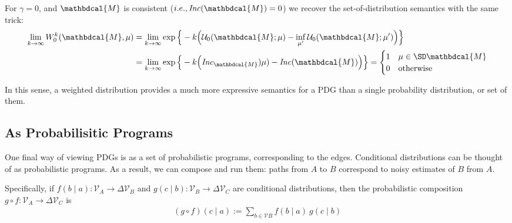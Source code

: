 \documentclass[letterpaper]{article} %
\theoremstyle{plain}
\theoremstyle{definition}
\theoremstyle{remark}
\newcommand{\note}[1]{{\color{blue}\ \!\Large\smash{\textbf{[}}{\normalsize\textsc{note:} #1}\ \!\smash{\textbf{]}}}}
\newcommand{\dg}[1]{\mathbdcal{#1}}
\newcommand\Inc{\mathit{Inc}}
\begin{document}
{For $\gamma = 0$, and $\dg M$ is consistent
($i.e., \Inc(\dg   M) = 0$)
 we recover the set-of-distribution semantics with
          the same trick: 
	\begin{align*}
		 \lim_{k \to \infty} W_0^k(\dg M, \mu)
		&= \lim_{k \to \infty} \exp\Big\{-k \Big(\mathcal U_0(\dg M;\mu) - \inf_{\mu'} \mathcal U_0(\dg M; \mu')\Big) \Big\} \\
		&= \lim_{k \to \infty} \exp\Big\{-k \Big(\Inc_{\dg
                 M})\mu) - \Inc(\dg M)\Big) \Big\}  
		= \begin{cases}
			1 & \mu \in \SD\dg M \\
			0 & \text{otherwise}
		\end{cases} 
	\end{align*}

	In this sense, a weighted distribution provides a much more expressive semantics for a PDG than a single probability distribution, or set of them.

	\begin{vleftovers}
	\subsection{As Probabilisitic Programs}\label{sec:prog-semantics}
	
	One final way of viewing PDGs is as a set of probabilistic programs, corresponding to the edges. 
	Conditional distributions can be thought of as probabilistic programs. As a result, we can compose and run them: paths from $A$ to $B$ correspond to noisy estimates of $B$ from $A$.
	
	Specifically, if $f(b \mid a) : \mathcal V_A \to \Delta \mathcal V_B$ and $g(c \mid b) : \mathcal V_B \to \Delta \mathcal V_C$ are conditional distributions, then the probabilistic composition $g\circ f : \mathcal V_A \to \Delta\mathcal V_C$ is
	\begin{align*}
		(g\circ  f) (c \mid a) :=  \sum_{b \in \mathcal V B}\!\! f (b \mid a)\ g(c \mid b)
	\end{align*}
	

\end{vleftovers}}
\end{document}
